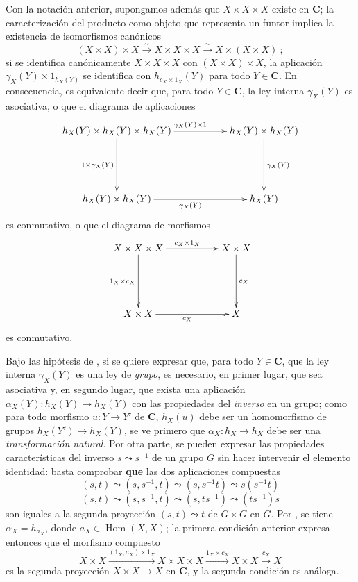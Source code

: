 \begin{env}[8.2.5]
\label{0.8.2.5}
\label{0.8.2.5-fr}
Con la notación anterior, supongamos además que $X\times X\times X$ existe en $\boldsymbol{C}$; la caracterización del producto como objeto que representa un funtor  implica la existencia de isomorfismos canónicos
\[
  (X\times X)\times X\xrightarrow{\sim}X\times X\times X
  \xrightarrow{\sim}X\times(X\times X)~;
\]
si se identifica canónicamente $X\times X\times X$ con $(X\times X)\times X$, la aplicación $\gamma_X(Y)\times 1_{h_X(Y)}$ se identifica con $h_{c_X\times 1_X}(Y)$ para todo $Y\in \boldsymbol{C}$.
En consecuencia, es equivalente decir que, para todo $Y\in \boldsymbol{C}$, la ley interna $\gamma_X(Y)$ es asociativa, o que el diagrama de aplicaciones
\[
  \xymatrix{
    h_X(Y)\times h_X(Y)\times h_X(Y)
      \ar[rr]^{\gamma_X(Y)\times 1}\ar[dd]_{1\times\gamma_X(Y)} &&
    h_X(Y)\times h_X(Y)\ar[dd]^{\gamma_X(Y)}\\\\
    h_X(Y)\times h_X(Y)\ar[rr]_{\gamma_X(Y)} && h_X(Y)
  }
\]
es conmutativo, o que el diagrama de morfismos
\[
  \xymatrix{
    X\times X\times X
      \ar[rr]^{c_X\times 1_X}\ar[dd]_{1_X\times c_X} &&
    X\times X\ar[dd]^{c_X}\\\\
    X\times X\ar[rr]_{c_X} && X
  }
\]
es conmutativo.
\end{env}

\begin{env}[8.2.6]
\label{0.8.2.6}
\label{0.8.2.6-fr}
Bajo las hipótesis de , si se quiere expresar que, para todo $Y\in \boldsymbol{C}$, que la ley interna $\gamma_X(Y)$ es una ley de \emph{grupo}, es necesario, en primer lugar, que sea asociativa y, en segundo lugar, que exista una aplicación $\alpha_X(Y):h_X(Y)\to h_X(Y)$ con las propiedades del \emph{inverso} en un grupo; como para todo morfismo $u:Y\to Y'$ de $\boldsymbol{C}$, $h_X(u)$ debe ser un homomorfismo de grupos $h_X(Y')\to h_X(Y)$, se ve primero que $\alpha_X:h_X\to h_X$ debe ser una \emph{transformación natural}.
Por otra parte, se pueden expresar las propiedades características del inverso $s\leadsto s^{-1}$ de un grupo $G$ sin hacer intervenir el elemento identidad: basta comprobar \textbf{que} las dos aplicaciones compuestas
\[
  (s,t)\leadsto(s,s^{-1},t)\leadsto(s,s^{-1}t)\leadsto s(s^{-1}t)
\]
\[
  (s,t)\leadsto(s,s^{-1},t)\leadsto(s,ts^{-1})\leadsto(ts^{-1})s
\]
son iguales a la segunda proyección $(s,t)\leadsto t$ de $G\times G$ en $G$.
Por , se tiene $\alpha_X=h_{a_X}$, donde $a_X\in\operatorname{Hom}(X,X)$; la primera condición anterior expresa entonces que el morfismo compuesto
\[
  X\times X\xrightarrow{(1_X,a_X)\times 1_X}X\times X\times X
  \xrightarrow{1_X\times c_X}X\times X\xrightarrow{c_X}X
\]
es la segunda proyección $X\times X\to X$ en $\boldsymbol{C}$, y la segunda condición es análoga.
\end{env}

